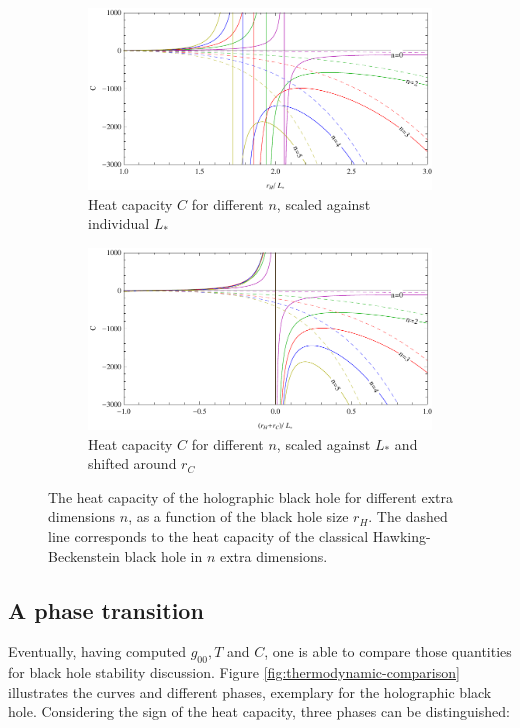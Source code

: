 \documentclass[12pt,a4paper]{report}
\numberwithin{equation}{chapter}
\begin{document}
\begin{figure}
\begin{center}
\begin{subfigure}{\textwidth}
\caption{Heat capacity $C$ for different $n$, scaled against individual $L_*$}
\includegraphics[scale=1]{figures/heat-capacity-plot-naive-holography-n.pdf}
\end{subfigure}
\begin{subfigure}{\textwidth}
\caption{Heat capacity $C$ for different $n$, scaled against $L_*$ and shifted around $r_C$}
\includegraphics[scale=1]{figures/heat-capacity-plot-holography-n.pdf}
\end{subfigure}
\end{center}
\caption[Holographic metric heat capacity plots]{The heat capacity of the holographic black hole for different extra dimensions $n$, as a function of the black hole size $r_H$. The dashed line corresponds to the heat capacity of the classical Hawking-Beckenstein black hole in $n$ extra dimensions.}
\end{figure}

\subsection{A phase transition}\label{sec:phase-transition}
Eventually, having computed $g_{00}, T$ and $C$, one is able to compare those quantities for black hole stability discussion. Figure \ref{fig:thermodynamic-comparison} illustrates the curves and different phases, exemplary for the holographic black hole. Considering the sign of the heat capacity, three phases can be distinguished:
\end{document}
